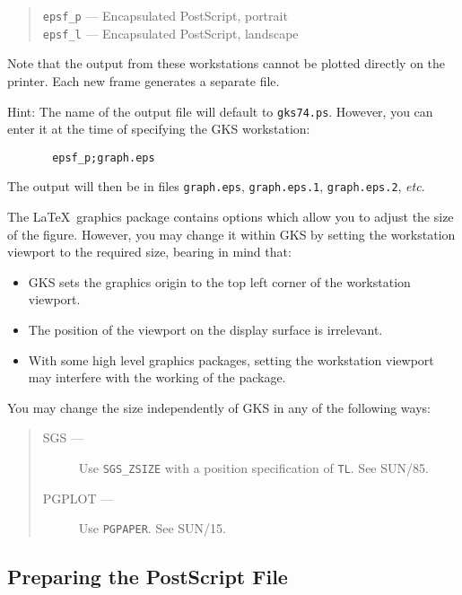 \documentclass[11pt,twoside]{article}
\newcommand{\xref}[3]{#1}
\newcommand{\xlabel}[1]{}
\begin{document}
\begin{quote}
  \texttt{epsf\_p} --- Encapsulated PostScript, portrait\\
  \texttt{epsf\_l} --- Encapsulated PostScript, landscape
\end{quote}

Note that the output from these workstations cannot be plotted directly on 
the printer. Each new frame generates a separate file.

Hint: The name of the output file will default to \texttt{gks74.ps}. 
However, you can enter it at the time of specifying the GKS workstation:

\begin{verbatim}
       epsf_p;graph.eps
\end{verbatim}

The output will then be in files \texttt{graph.eps}, 
\texttt{graph.eps.1}, \texttt{graph.eps.2}, \emph{etc}.

The \LaTeX\ graphics package contains options which allow you to 
adjust the size of the figure. 
However, you may change it within GKS by setting the workstation viewport to 
the required size, bearing in mind that:

\begin{itemize} 
  \item GKS sets the graphics origin to the top left corner of the workstation 
        viewport.
  \item The position of the viewport on the display surface is irrelevant.
  \item With some high level graphics packages, setting the workstation 
        viewport may interfere with the working of the package. 
\end{itemize}

You may change the size independently of GKS in any of the following ways:

\begin{quote}
  \begin{description}
    \item[SGS ---] Use \texttt{SGS\_ZSIZE} with a position specification of \texttt{TL}.
               See \xref{SUN/85}{sun85}{}\cite{sun85}.
    \item[PGPLOT ---] Use \texttt{PGPAPER}. See \xref{SUN/15}{sun15}{}\cite{sun15}.
  \end{description}
\end{quote}

\subsection{\xlabel{preparing_the_postscript_file}\label{preparing_the_postscript_file}Preparing the PostScript File}
\end{document}
